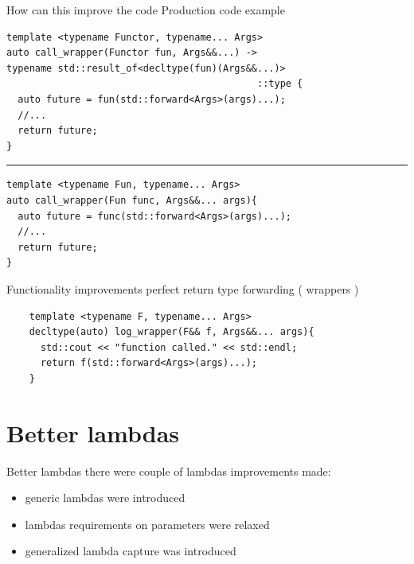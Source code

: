 \documentclass[10pt]{beamer}
\begin{document}
\begin{frame}[fragile]{How can this improve the code}
	\centering Production code example
	\begin{verbatim}
template <typename Functor, typename... Args>
auto call_wrapper(Functor fun, Args&&...) ->
typename std::result_of<decltype(fun)(Args&&...)>
                                            ::type {
  auto future = fun(std::forward<Args>(args)...);
  //...
  return future;
}
	\end{verbatim}

	\pause
	\hrule

\begin{verbatim}
template <typename Fun, typename... Args>
auto call_wrapper(Fun func, Args&&... args){
  auto future = func(std::forward<Args>(args)...);
  //...
  return future;
}
\end{verbatim}
\end{frame}

\begin{frame}[fragile]{Functionality improvements}
\centering 
	perfect return type forwarding ( wrappers ) \\
	\vfill

	\begin{verbatim}
    template <typename F, typename... Args>
    decltype(auto) log_wrapper(F&& f, Args&&... args){
	  std::cout << "function called." << std::endl;
	  return f(std::forward<Args>(args)...);
    }
	\end{verbatim}

\end{frame}

\section{Better lambdas}
\begin{frame}{Better lambdas}
	\centering there were couple of lambdas improvements made:
	\begin{itemize}[<+- |alert@+>]
	\item generic lambdas were introduced
	\item lambdas requirements on parameters were relaxed
	\item generalized lambda capture was introduced
	\end{itemize}
\end{frame}
\end{document}
